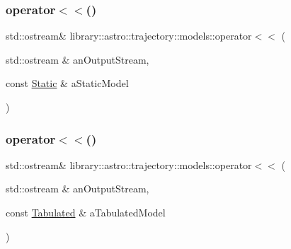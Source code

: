 \subsubsection{\texorpdfstring{operator$<$$<$()}{operator<<()}\hspace{0.1cm}{\footnotesize\ttfamily [1/2]}}
{\footnotesize\ttfamily std\+::ostream\& library\+::astro\+::trajectory\+::models\+::operator$<$$<$ (\begin{DoxyParamCaption}\item[{std\+::ostream \&}]{an\+Output\+Stream,  }\item[{const \hyperlink{classlibrary_1_1astro_1_1trajectory_1_1models_1_1_static}{Static} \&}]{a\+Static\+Model }\end{DoxyParamCaption})}

\mbox{\label{namespacelibrary_1_1astro_1_1trajectory_1_1models_abeeeb7b255bbca2ab8e9d0e64966cfaf}} 
\subsubsection{\texorpdfstring{operator$<$$<$()}{operator<<()}\hspace{0.1cm}{\footnotesize\ttfamily [2/2]}}
{\footnotesize\ttfamily std\+::ostream\& library\+::astro\+::trajectory\+::models\+::operator$<$$<$ (\begin{DoxyParamCaption}\item[{std\+::ostream \&}]{an\+Output\+Stream,  }\item[{const \hyperlink{classlibrary_1_1astro_1_1trajectory_1_1models_1_1_tabulated}{Tabulated} \&}]{a\+Tabulated\+Model }\end{DoxyParamCaption})}

